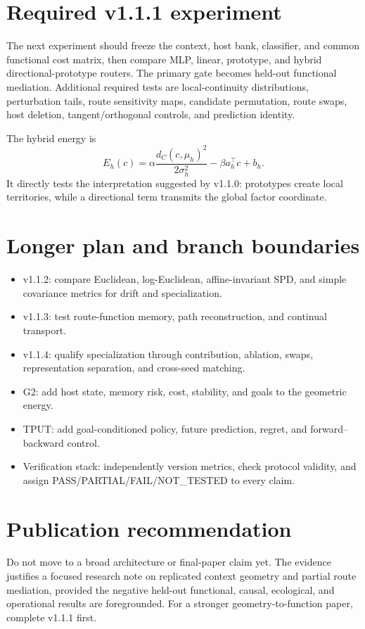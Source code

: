 \documentclass[11pt,a4paper]{article}
\begin{document}
\section{Required v1.1.1 experiment}
The next experiment should freeze the context, host bank, classifier, and common functional cost matrix, then compare MLP, linear, prototype, and hybrid directional-prototype routers. The primary gate becomes held-out functional mediation. Additional required tests are local-continuity distributions, perturbation tails, route sensitivity maps, candidate permutation, route swaps, host deletion, tangent/orthogonal controls, and prediction identity.

The hybrid energy is
\begin{equation}
E_h(c)=\alpha\frac{d_C(c,\mu_h)^2}{2\sigma_h^2}-\beta a_h^\top c+b_h.
\end{equation}
It directly tests the interpretation suggested by v1.1.0: prototypes create local territories, while a directional term transmits the global factor coordinate.

\section{Longer plan and branch boundaries}
\begin{itemize}
\item v1.1.2: compare Euclidean, log-Euclidean, affine-invariant SPD, and simple covariance metrics for drift and specialization.
\item v1.1.3: test route-function memory, path reconstruction, and continual transport.
\item v1.1.4: qualify specialization through contribution, ablation, swaps, representation separation, and cross-seed matching.
\item G2: add host state, memory risk, cost, stability, and goals to the geometric energy.
\item TPUT: add goal-conditioned policy, future prediction, regret, and forward--backward control.
\item Verification stack: independently version metrics, check protocol validity, and assign PASS/PARTIAL/FAIL/NOT\_TESTED to every claim.
\end{itemize}

\section{Publication recommendation}
\begin{warningbox}[Recommendation]
Do not move to a broad architecture or final-paper claim yet. The evidence justifies a focused research note on replicated context geometry and partial route mediation, provided the negative held-out functional, causal, ecological, and operational results are foregrounded. For a stronger geometry-to-function paper, complete v1.1.1 first.
\end{warningbox}
\end{document}
